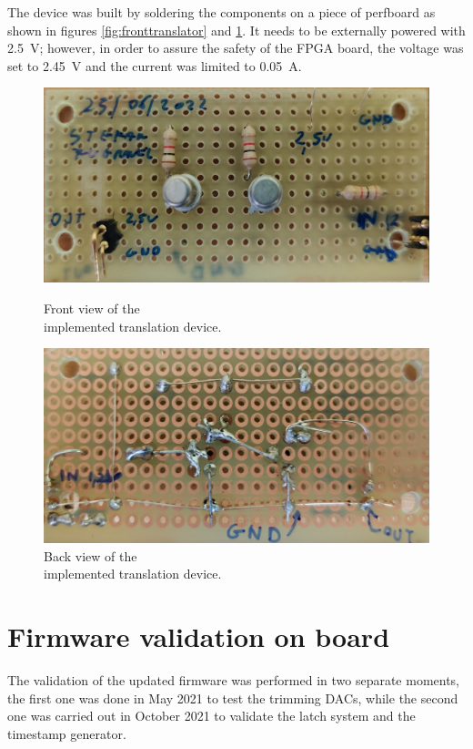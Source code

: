\noindent The device was built by soldering the components on a piece of perfboard as shown in figures \ref{fig:fronttranslator} and \ref{fig:backtranslator}.
It needs to be externally powered with 2.5~V; however, in order to assure the safety of the FPGA board, the voltage was set to 2.45~V and the current was limited to 0.05~A. 
\begin{figure}[H]
	\centering
	\begin{minipage}{.5\textwidth}
		\centering
		\includegraphics[width=.99\linewidth]{IMG/ch5/FRONTTRANSLATOR}
		\caption{Front view of the \\implemented translation device.}
		\label{fig:fronttranslator}
	\end{minipage}%
	\begin{minipage}{.5\textwidth}
		\centering
		\includegraphics[width=.99\linewidth]{IMG/ch5/BACKTRANSLATOR}
		\caption{Back view of the \\implemented translation device.}
		\label{fig:backtranslator}
	\end{minipage}
\end{figure}

\section{Firmware validation on board}
The validation of the updated firmware was performed in two separate moments, the first one was done in May 2021 to test the trimming DACs, while the second one was carried out in October 2021 to validate the latch system and the timestamp generator. 
